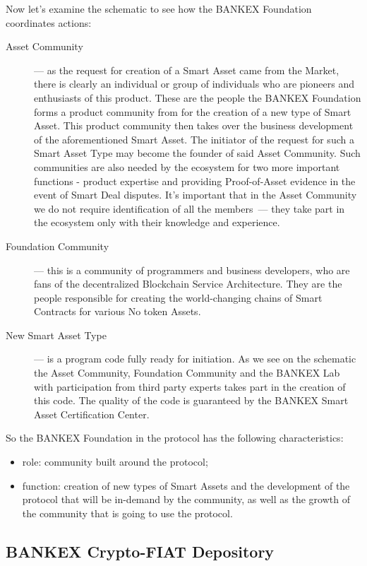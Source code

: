 \documentclass{article}
\begin{document}
\begin{multicols}{2}
Now let’s examine the schematic to see how the BANKEX Foundation coordinates actions:

\begin{description}

\item[Asset Community]--- as the request for creation of a Smart Asset came from the Market, there is clearly an individual or group of individuals who are pioneers and enthusiasts of this product. These are the people the BANKEX Foundation forms a product community from for the creation of a new type of Smart Asset. This product community then takes over the business development of the aforementioned Smart Asset. The initiator of the request for such a Smart Asset Type may become the founder of said Asset Community. Such communities are also needed by the ecosystem for two more important functions - product expertise and providing Proof-of-Asset evidence in the event of Smart Deal disputes. It’s important that in the Asset Community we do not require identification of all the members~--- they take part in the ecosystem only with their knowledge and experience. 
\item[Foundation Community]--- this is a community of programmers and business developers, who are fans of the decentralized Blockchain Service Architecture. They are the people responsible for creating the world-changing chains of Smart Contracts for various No token Assets.
\item[New Smart Asset Type]--- is a program code fully ready for initiation. As we see on the schematic the Asset Community, Foundation Community and the BANKEX Lab with participation from third party experts takes part in the creation of this code. The quality of the code is guaranteed by the BANKEX Smart Asset Certification Center.
\end{description}

So the BANKEX Foundation in the protocol has the following characteristics:

\begin{itemize}
\item role: community built around the protocol;
\item function: creation of new types of Smart Assets and the development of the protocol that will be in-demand by the community, as well as the growth of the community that is going to use the protocol.
\end{itemize}

\subsection{BANKEX Crypto-FIAT Depository}


\end{multicols}
\end{document}
